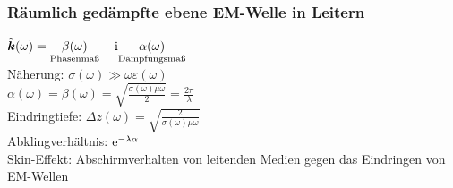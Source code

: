 \documentclass[6pt,a4paper]{scrartcl}
\begin{document}
\begin{multicols}{4}
	\subsubsection{Räumlich gedämpfte ebene EM-Welle in Leitern}
	$\tilde{\boldsymbol{k}}(\omega) = \underset{\text{Phasenmaß}}{\beta(\omega)} - \mathrm{i} \underset{\text{Dämpfungsmaß}}{\alpha(\omega)}$\\
	Näherung: $\sigma(\omega) \gg \omega\varepsilon(\omega)$\\
	$\alpha(\omega) = \beta(\omega) = \sqrt{\frac{\sigma(\omega)\mu\omega}{2}} = \frac{2\pi}{\lambda}$\\
	Eindringtiefe: $\Delta z(\omega) = \sqrt{\frac{2}{\sigma(\omega)\mu\omega}}$\\
	Abklingverhältnis: $\mathrm{e}^{-\lambda\alpha}$\\
	Skin-Effekt: Abschirmverhalten von leitenden Medien gegen das Eindringen von EM-Wellen

\end{multicols}
\end{document}
